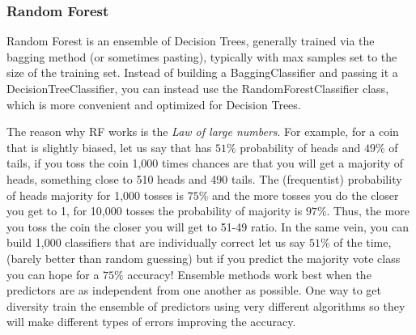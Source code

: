 \documentclass[11pt]{article}
\begin{document}
\subsubsection{Random Forest}

Random Forest is an ensemble of Decision Trees, generally trained via the bagging method (or sometimes pasting), typically with max samples set to the size of the training set. Instead of building a BaggingClassifier and passing it a DecisionTreeClassifier, you can instead use the RandomForestClassifier class, which is more convenient and optimized for Decision Trees.

The reason why RF works is the \emph{Law of large numbers}. For example, for a coin that is slightly biased, let us say that has $51\%$ probability of heads and $49\%$ of tails, if you toss the coin 1,000 times chances are that you will get a majority of heads, something close to 510 heads and 490 tails. The (frequentist) probability of heads majority for 1,000 tosses is $75\%$ and the more tosses you do the closer you get to 1, for 10,000 tosses the probability of majority is $97\%$. Thus, the more you toss the coin the closer you will get to 51-49 ratio. In the same vein, you can build 1,000 classifiers that are individually correct let us say $51\%$ of the time, (barely better than random guessing) but if you predict the majority vote class you can hope for a $75\%$ accuracy! Ensemble methods work best when the predictors are as independent from one another as possible. One way to get diversity train the ensemble of predictors  using very different algorithms so they will make different types of errors improving the accuracy.\cite{geron2017hands}


\end{document}
